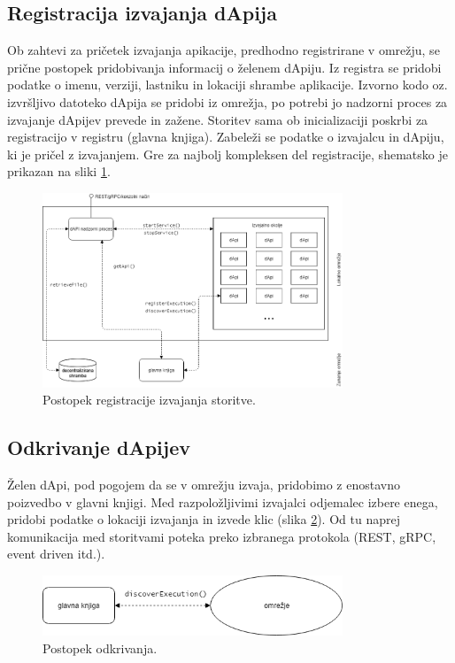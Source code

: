 \documentclass[a4paper, 12pt]{book}
\begin{document}
\subsection{Registracija izvajanja dApija}
\label{registerExecution}
Ob zahtevi za pričetek izvajanja apikacije, predhodno registrirane v omrežju, se prične postopek pridobivanja informacij o želenem dApiju.
Iz registra se pridobi podatke o imenu, verziji, lastniku in lokaciji shrambe aplikacije.
Izvorno kodo oz. izvršljivo datoteko dApija se pridobi iz omrežja, po potrebi jo nadzorni proces za izvajanje dApijev prevede in zažene.
Storitev sama ob inicializaciji poskrbi za registracijo v registru (glavna knjiga).
Zabeleži se podatke o izvajalcu in dApiju, ki je pričel z izvajanjem.
Gre za najbolj kompleksen del registracije, shematsko je prikazan na sliki \ref{register_service}.

\begin{figure}[h]
	\centering
	\includegraphics[width=0.8\textwidth]{slike/register_service.png}
	\caption{Postopek registracije izvajanja storitve.}
	\label{register_service}
\end{figure}

\subsection{Odkrivanje dApijev}
\label{serviceDiscovery}
Želen dApi, pod pogojem da se v omrežju izvaja, pridobimo z enostavno poizvedbo v glavni knjigi.
Med razpoložljivimi izvajalci odjemalec izbere enega, pridobi podatke o lokaciji izvajanja in izvede klic (slika  \ref{discover_service}).
Od tu naprej komunikacija med storitvami poteka preko izbranega protokola (REST, gRPC, event driven itd.).

\begin{figure}[h]
	\centering
	\includegraphics[width=0.8\textwidth]{slike/discover_service.png}
	\caption{Postopek odkrivanja.}
	\label{discover_service}
\end{figure}
\end{document}
